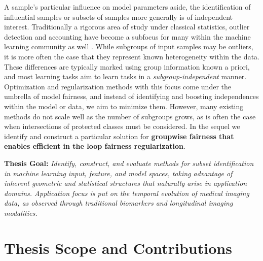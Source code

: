 

A sample's particular influence on model parameters aside, the identification of influential samples or subsets of samples more generally is of independent interest. 
Traditionally a rigorous area of study under classical statistics, outlier detection and accounting have become a subfocus for many within the machine learning community as well \citep{golatkar2020eternal,golatkar2020forgetting,huang2020feature,ren2019likelihood}.
While subgroups of input samples may be outliers, it is more often the case that they represent known heterogeneity within the data. 
These differences are typically marked using 
group information known a priori, and 
most learning tasks aim to learn tasks
in a \textit{subgroup-independent} manner.
Optimization and regularization methods with this focus come under the umbrella of model fairness, and instead of identifying and boosting independences within the model or data, we aim to minimize them.
However, many existing methods do not scale well as the number of subgroups grows, as is often the case when intersections of protected classes must be considered. In the sequel we identify and construct a particular solution for \textbf{groupwise fairness that enables efficient in the loop fairness regularization}.

\clearpage
\begin{mdframed}[style=MyFrame]
{\bf Thesis Goal: }
\em Identify, construct, and evaluate methods for subset identification in machine learning input, feature, and model spaces, taking advantage of inherent geometric and statistical structures that naturally arise in application domains. 
Application focus is put on the temporal evolution of medical imaging data, as observed through traditional biomarkers and longitudinal imaging modalities.
\end{mdframed}

\section{Thesis Scope and Contributions}

